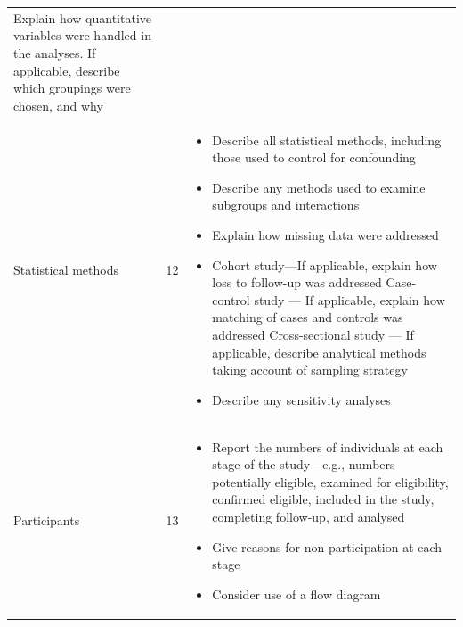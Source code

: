 \documentclass[]{book}
\providecommand{\tightlist}{%
  \setlength{\itemsep}{0pt}\setlength{\parskip}{0pt}}
\begin{document}
\begin{longtable}[]{@{}lll@{}}
\begin{minipage}[t]{0.40\columnwidth}
Explain how quantitative
variables were handled in the
analyses. If applicable,
describe which groupings were
chosen, and why\strut
\end{minipage}\tabularnewline
\begin{minipage}[t]{0.34\columnwidth}\raggedright
Statistical methods\strut
\end{minipage} & \begin{minipage}[t]{0.17\columnwidth}\raggedright
12\strut
\end{minipage} & \begin{minipage}[t]{0.40\columnwidth}\raggedright
\begin{itemize}
\tightlist
\item
  Describe all statistical
  methods, including those used
  to control for confounding
\item
  Describe any methods used to
  examine subgroups and
  interactions
\item
  Explain how missing data
  were addressed
\item
  Cohort study---If applicable,
  explain how loss to follow-up
  was addressed
  Case-control study --- If
  applicable, explain how
  matching of cases and controls
  was addressed
  Cross-sectional study --- If
  applicable, describe
  analytical methods taking
  account of sampling strategy
\item
  Describe any sensitivity
  analyses
\end{itemize}\strut
\end{minipage}\tabularnewline
\begin{minipage}[t]{0.34\columnwidth}\raggedright
Participants\strut
\end{minipage} & \begin{minipage}[t]{0.17\columnwidth}\raggedright
13\strut
\end{minipage} & \begin{minipage}[t]{0.40\columnwidth}\raggedright
\begin{itemize}
\tightlist
\item
  Report the numbers of
  individuals at each stage of
  the study---e.g., numbers
  potentially eligible, examined
  for eligibility, confirmed
  eligible, included in the
  study, completing follow-up,
  and analysed
\item
  Give reasons for
  non-participation at each
  stage
\item
  Consider use of a flow
  diagram
\end{itemize}\strut
\end{minipage}\tabularnewline

\end{longtable}
\end{document}
